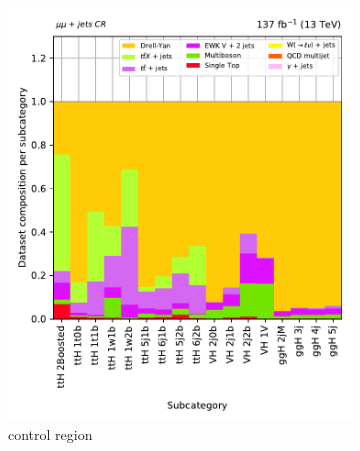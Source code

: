 \begin{figure}[htbp]
    \begin{subfigure}[b]{0.3\textwidth}
        \includegraphics[width=\textwidth]{figures/region_plots/full_Run2/region_2/background_composition.pdf}
        \caption{\doubleMuCr control region}
    \end{subfigure}
    \hfill
    \begin{subfigure}[b]{0.3\textwidth}

\end{subfigure}
\end{figure}
